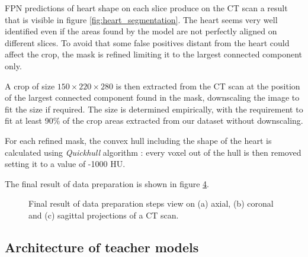 FPN predictions of heart shape on each slice produce on the CT scan a result that is visible in figure \ref{fig:heart_segmentation}.
The heart seems very well identified even if the areas found by the model are not perfectly aligned on different slices.
To avoid that some false positives distant from the heart could affect the crop, the mask is refined limiting it to the largest connected component only.

A crop of size $150\times220\times280$ is then extracted from the CT scan at the position of the largest connected component found in the mask, downscaling the image to fit the size if required.
The size is determined empirically, with the requirement to fit at least 90\% of the crop areas extracted from our dataset without downscaling. 

For each refined mask, the convex hull including the shape of the heart is calculated using \emph{Quickhull} algorithm \cite{barber1996quickhull}: every voxel out of the hull is then removed setting it to a value of -1000 HU.

The final result of data preparation is shown in figure \ref{fig:heart_crop}.

\begin{figure}
    \centering
    \begin{subfigure}[c]{0.3\textwidth}
        \caption{}
        \label{subfig:heart_crop_axial}
    \end{subfigure}\hspace{1em}
    \begin{subfigure}[c]{0.3\textwidth}
        \caption{}
        \label{subfig:heart_crop_coronal}
    \end{subfigure}\hspace{1em}
    \begin{subfigure}[c]{0.3\textwidth}
        \caption{}
        \label{subfig:heart_crop_sagittal}
    \end{subfigure}
    
    \caption{Final result of data preparation steps view on (a) axial, (b) coronal and (c) sagittal projections of a CT scan.}
    \label{fig:heart_crop}
\end{figure}


\subsection{Architecture of teacher models}

